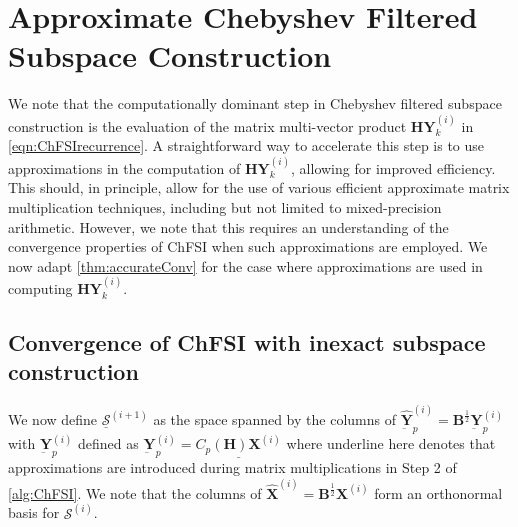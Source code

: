 \documentclass[preprint,3p,number,sort&compress]{elsarticle}
\newcommand{\bB}{\textbf{B}}
\newcommand{\bH}{\textbf{H}}
\newcommand{\bX}{\textbf{X}}
\newcommand{\bY}{\textbf{Y}}
\newcommand{\apx}[1]{\underline {#1}}
\begin{document}
\section{Approximate Chebyshev Filtered Subspace Construction}\label{sec:apprxSubspaceConstr}
We note that the computationally dominant step in Chebyshev filtered subspace construction is the evaluation of the matrix multi-vector product $\bH\bY_k^{(i)}$ in \cref{eqn:ChFSIrecurrence}. A straightforward way to accelerate this step is to use approximations in the computation of $\bH\bY_k^{(i)}$, allowing for improved efficiency. This should, in principle, allow for the use of various efficient approximate matrix multiplication techniques, including but not limited to mixed-precision arithmetic. However, we note that this requires an understanding of the convergence properties of ChFSI when such approximations are employed. We now adapt \cref{thm:accurateConv} for the case where approximations are used in computing $\bH\bY_k^{(i)}$.


\subsection{Convergence of ChFSI with inexact subspace construction}
We now define $\underline{\mathcal{S}}^{(i+1)}$ as the space spanned by the columns of $\hat{\underbar{\bY}}_p^{(i)}=\bB^{\frac{1}{2}}{\underbar {\bY}}_p^{(i)}$ with ${\underbar{\bY}}_p^{(i)}$ defined as $\underbar{\bY}_p^{(i)}=\apx{C_p(\bH)\bX^{(i)}}$ where underline here denotes that approximations are introduced during matrix multiplications in Step 2 of \cref{alg:ChFSI}. We note that the columns of $\hat{\bX}^{(i)}=\bB^{\frac{1}{2}}\bX^{(i)}$ form an orthonormal basis for $\mathcal{S}^{(i)}$. 
\end{document}
